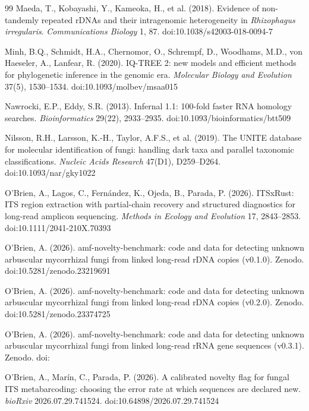 \documentclass[11pt]{article}
\begin{document}
\begin{thebibliography}{99}
Maeda, T., Kobayashi, Y., Kameoka, H., et al. (2018). Evidence of non-tandemly repeated
rDNAs and their intragenomic heterogeneity in \emph{Rhizophagus irregularis}.
\emph{Communications Biology} 1, 87. doi:10.1038/s42003-018-0094-7

Minh, B.Q., Schmidt, H.A., Chernomor, O., Schrempf, D., Woodhams, M.D., von Haeseler, A., Lanfear, R. (2020).
IQ-TREE 2: new models and efficient methods for phylogenetic inference in the genomic era.
\emph{Molecular Biology and Evolution} 37(5), 1530--1534. doi:10.1093/molbev/msaa015

Nawrocki, E.P., Eddy, S.R. (2013). Infernal 1.1: 100-fold faster RNA homology searches. \emph{Bioinformatics}
29(22), 2933--2935. doi:10.1093/bioinformatics/btt509

Nilsson, R.H., Larsson, K.-H., Taylor, A.F.S., et al. (2019). The UNITE database
for molecular identification of fungi: handling dark taxa and parallel taxonomic
classifications. \emph{Nucleic Acids Research} 47(D1), D259--D264.
doi:10.1093/nar/gky1022

O'Brien, A., Lagos, C., Fern\'andez, K., Ojeda, B., Parada, P. (2026). ITSxRust: ITS region extraction
with partial-chain recovery and structured diagnostics for long-read amplicon sequencing. \emph{Methods in
Ecology and Evolution} 17, 2843--2853. doi:10.1111/2041-210X.70393

O'Brien, A. (2026). amf-novelty-benchmark: code and data for detecting unknown arbuscular
mycorrhizal fungi from linked long-read rDNA copies (v0.1.0). Zenodo. doi:10.5281/zenodo.23219691

O'Brien, A. (2026). amf-novelty-benchmark: code and data for detecting unknown arbuscular
mycorrhizal fungi from linked long-read rDNA copies (v0.2.0). Zenodo. doi:10.5281/zenodo.23374725

O'Brien, A. (2026). amf-novelty-benchmark: code and data for detecting unknown arbuscular
mycorrhizal fungi from linked long-read rRNA gene sequences (v0.3.1). Zenodo. doi:\ReleaseDOI{}

O'Brien, A., Mar\'in, C., Parada, P. (2026). A calibrated novelty flag for fungal ITS
metabarcoding: choosing the error rate at which sequences are declared new. \emph{bioRxiv}
2026.07.29.741524. doi:10.64898/2026.07.29.741524


\end{thebibliography}
\end{document}
